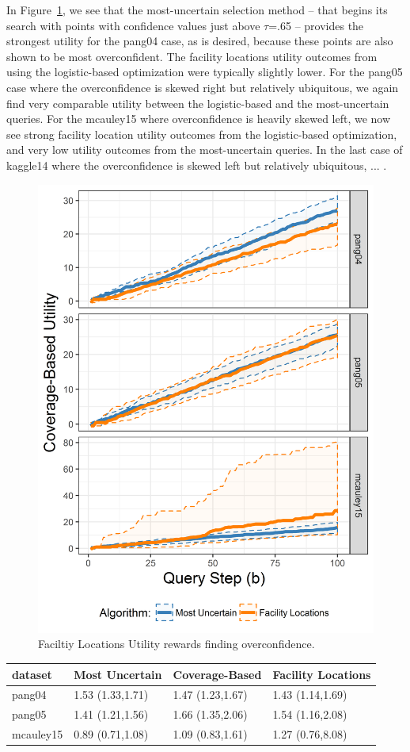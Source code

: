 \documentclass[letterpaper]{article} %
\newcommand{\km}[1]{{\color{red} #1}} %
\begin{document}
In Figure~\ref{fig:flutil}, we see that the most-uncertain selection method – that begins its search with points with confidence values just above $\tau$=.65 – provides the strongest utility for the pang04 case, as is desired, because these points are also shown to be most overconfident. The facility locations utility outcomes from using the logistic-based optimization were typically slightly lower. For the pang05 case where the overconfidence is skewed right but relatively ubiquitous, we again find very comparable utility between the logistic-based and the most-uncertain queries. For the mcauley15 where overconfidence is heavily skewed left, we now see strong facility location utility outcomes from the logistic-based optimization, and very low utility outcomes from the most-uncertain queries. \km{In the last case of kaggle14 where the overconfidence is skewed left but relatively ubiquitous, ...} . 



\begin{figure}[hbtp]
  \includegraphics[width=.45\textwidth]{../experimentsAndPlots/flUtilPlaceholder.png}
  \caption{Faciltiy Locations Utility rewards finding overconfidence.}
  \label{fig:flutil}
\end{figure}

\begin{table}[ht]
\small
\centering
\begin{tabular}{llll}
  \hline
dataset & Most Uncertain & Coverage-Based & Facility Locations \\ 
  \hline
pang04 & 1.53 (1.33,1.71) & 1.47 (1.23,1.67) & 1.43 (1.14,1.69) \\ 
  pang05 & 1.41 (1.21,1.56) & 1.66 (1.35,2.06) & 1.54 (1.16,2.08) \\ 
  mcauley15 & 0.89 (0.71,1.08) & 1.09 (0.83,1.61) & 1.27 (0.76,8.08) \\ 
   \hline
\end{tabular}
\normalsize
\end{table}
\end{document}
